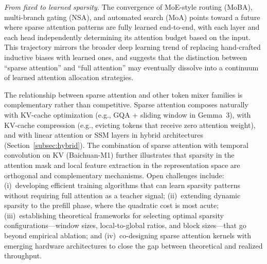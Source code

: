 \emph{From fixed to learned sparsity.} The convergence of MoE-style routing (MoBA), multi-branch gating (NSA), and automated search (MoA) points toward a future where sparse attention patterns are fully learned end-to-end, with each layer and each head independently determining its attention budget based on the input. This trajectory mirrors the broader deep learning trend of replacing hand-crafted inductive biases with learned ones, and suggests that the distinction between ``sparse attention'' and ``full attention'' may eventually dissolve into a continuum of learned attention allocation strategies.

The relationship between sparse attention and other token mixer families is complementary rather than competitive. Sparse attention composes naturally with KV-cache optimization (e.g., GQA + sliding window in Gemma~3), with KV-cache compression (e.g., evicting tokens that receive zero attention weight), and with linear attention or SSM layers in hybrid architectures (Section~\ref{subsec:hybrid}). The combination of sparse attention with temporal convolution on KV (Baichuan-M1) further illustrates that sparsity in the attention mask and local feature extraction in the representation space are orthogonal and complementary mechanisms. Open challenges include: (i)~developing efficient training algorithms that can learn sparsity patterns without requiring full attention as a teacher signal; (ii)~extending dynamic sparsity to the prefill phase, where the quadratic cost is most acute; (iii)~establishing theoretical frameworks for selecting optimal sparsity configurations---window sizes, local-to-global ratios, and block sizes---that go beyond empirical ablation; and (iv)~co-designing sparse attention kernels with emerging hardware architectures to close the gap between theoretical and realized throughput.
